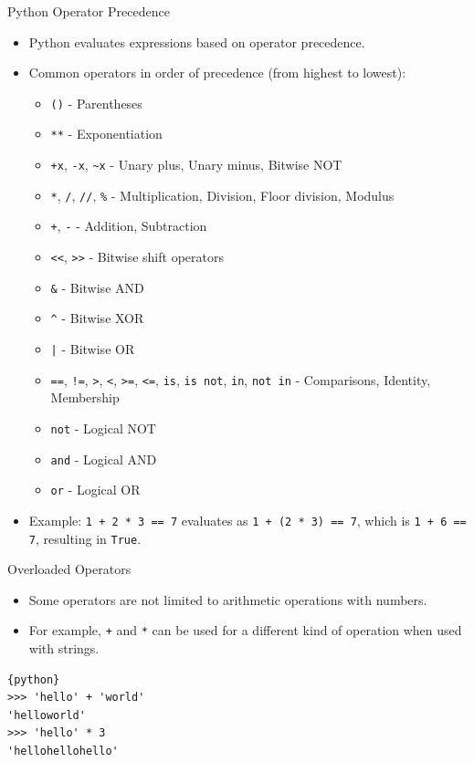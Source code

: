 \documentclass{beamer}
\begin{document}
\begin{frame}{Python Operator Precedence}
    \begin{itemize}
        \item Python evaluates expressions based on operator precedence.
        \item Common operators in order of precedence (from highest to lowest):
        \begin{itemize}
            \item \texttt{()} - Parentheses
            \item \texttt{**} - Exponentiation
            \item \texttt{+x}, \texttt{-x}, \texttt{\textasciitilde{}x} - Unary plus, Unary minus, Bitwise NOT
            \item \texttt{*}, \texttt{/}, \texttt{//}, \texttt{\%} - Multiplication, Division, Floor division, Modulus
            \item \texttt{+}, \texttt{-} - Addition, Subtraction
            \item \texttt{<<}, \texttt{>>} - Bitwise shift operators
            \item \texttt{\&} - Bitwise AND
            \item \texttt{\textasciicircum} - Bitwise XOR
            \item \texttt{|} - Bitwise OR
            \item \texttt{==}, \texttt{!=}, \texttt{>}, \texttt{<}, \texttt{>=}, \texttt{<=}, \texttt{is}, \texttt{is not}, \texttt{in}, \texttt{not in} - Comparisons, Identity, Membership
            \item \texttt{not} - Logical NOT
            \item \texttt{and} - Logical AND
            \item \texttt{or} - Logical OR
        \end{itemize}
        \item Example: \texttt{1 + 2 * 3 == 7} evaluates as \texttt{1 + (2 * 3) == 7}, which is \texttt{1 + 6 == 7}, resulting in \texttt{True}.
    \end{itemize}
\end{frame}
\begin{frame}[fragile]{Overloaded Operators}
    \begin{itemize}
        \item Some operators are not limited to arithmetic operations with numbers.
        \item For example, \texttt{+} and \texttt{*} can be used for a different kind of operation when used with strings.
    \end{itemize}
    \begin{lstlisting}{python}
>>> 'hello' + 'world'
'helloworld'
>>> 'hello' * 3
'hellohellohello'
    \end{lstlisting}
\end{frame}
\end{document}
